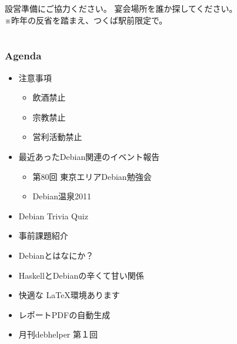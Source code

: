 \frame{\titlepage{}}


\begin{frame}{設営準備にご協力ください。}
宴会場所を誰か探してください。\\
※昨年の反省を踏まえ、つくば駅前限定で。
\end{frame}


\section{}
\begin{frame}
 \frametitle{Agenda}
\begin{minipage}[t]{0.45\hsize}
  \begin{itemize}
  \item 注意事項
	\begin{itemize}
	 \item 飲酒禁止
	 \item 宗教禁止
	 \item 営利活動禁止
	\end{itemize}
   \item 最近あったDebian関連のイベント報告
	\begin{itemize}
        \item 第80回 東京エリアDebian勉強会
	 \item Debian温泉2011
	\end{itemize}
 \end{itemize}
\end{minipage} 
\begin{minipage}[t]{0.45\hsize}
 \begin{itemize}
   \item Debian Trivia Quiz
   \item 事前課題紹介
   \item Debianとはなにか？
   \item HaskellとDebianの辛くて甘い関係
   \item 快適な \LaTeX 環境あります
   \item レポートPDFの自動生成
   \item 月刊debhelper 第１回
  \end{itemize}
\end{minipage}
\end{frame}

